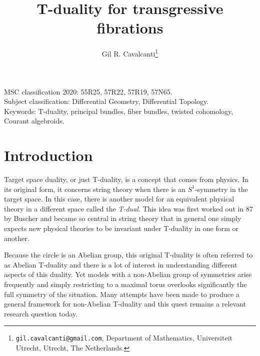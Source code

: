 \documentclass[12pt,twoside]{article}
\date{} \usepackage{color} \definecolor{tocolor}{rgb}{.1,.1,.5}
\theoremstyle{plain}
\theoremstyle{definition}
\numberwithin{equation}{section}
\begin{document}
\title{T-duality for transgressive fibrations}
\author{Gil R. Cavalcanti\thanks{{\tt gil.cavalcanti@gmail.com}, Department of Mathematics, Universiteit Utrecht, Utrecht, The Netherlands.}}
\maketitle

\vskip12pt
\noindent
MSC classification 2020: 	55R25, 57R22, 57R19, 57N65.\\
Subject classification: Differential Geometry, Differential Topology.\\
Keywords: T-duality, principal bundles, fiber bundles, twisted cohomology, Courant algebroids.\\

\tableofcontents

\section{Introduction}

Target space duality, or just T-duality, is a concept that comes from physics. In its original form, it concerns string theory when there is an $S^1$-symmetry in the target space. In this case, there is another model for an equivalent physical theory in a different space called the {\it T-dual}. This idea was first worked out in 87 by Buscher \cite{Bus87} and became so central in string theory that in general one simply expects new physical theories to be invariant under T-duality in one form or another. 

Because the circle is an Abelian group, this original T-duality is often referred to as Abelian T-duality and there is a lot of interest in understanding different aspects of this duality. Yet models with a non-Abelian group of symmetries arise frequently and simply restricting to a maximal torus overlooks significantly the full symmetry of the situation. Many attempts have been made to produce a general framework for non-Abelian T-duality \cite{DELAOSSA1993377,Giveon:1993ai,KlSe95,VonUnge:2002xjf} and this quest remains a relevant research question today.
\end{document}
